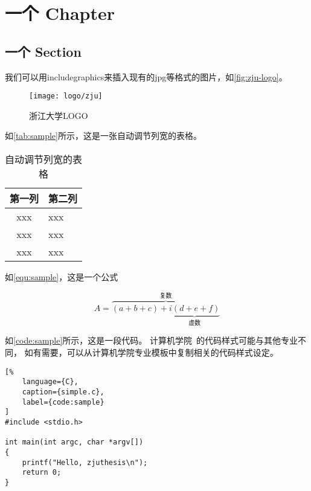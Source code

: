 \chapter{一个 Chapter}

\zhlipsum[1][name=zhufu]

\section{一个 Section}


\par 我们可以用includegraphics来插入现有的jpg等格式的图片，如\autoref{fig:zju-logo}。

\begin{figure}[ht]
    \centering
    \texttt{[image: logo/zju]}
    \caption{\label{fig:zju-logo}浙江大学LOGO}
\end{figure}

\par 如\autoref{tab:sample}所示，这是一张自动调节列宽的表格。

\begin{table}[ht]
    \caption{\label{tab:sample}自动调节列宽的表格}
    \begin{tabularx}{\linewidth}{|c|X<{\centering}|}
        \hline
        第一列 & 第二列 \\ \hline
        xxx & xxx \\ \hline
        xxx & xxx \\ \hline
        xxx & xxx \\ \hline
    \end{tabularx}
\end{table}

\par 如\autoref{equ:sample}，这是一个公式

\begin{equation}
    \label{equ:sample}
    A=\overbrace{(a+b+c)+\underbrace{i(d+e+f)}_{\text{虚数}}}^{\text{复数}}
\end{equation}

\par 如\autoref{code:sample}所示，这是一段代码。
计算机学院~\cite{zjuthesis}的代码样式可能与其他专业不同，
如有需要，可以从计算机学院专业模板中复制相关的代码样式设定。

\begin{lstlisting}[%
    language={C},
    caption={simple.c},
    label={code:sample}
]
#include <stdio.h>

int main(int argc, char *argv[])
{
    printf("Hello, zjuthesis\n");
    return 0;
}
\end{lstlisting}

